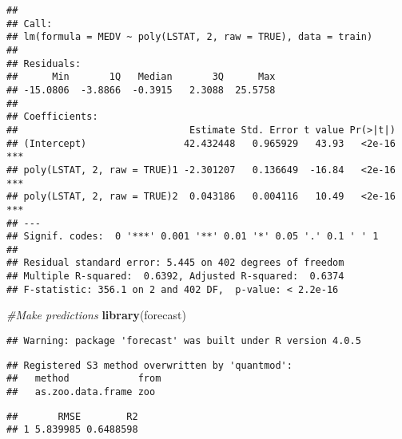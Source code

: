 \documentclass[
]{article}
\newenvironment{Shaded}{\begin{snugshade}}{\end{snugshade}}
\newcommand{\AttributeTok}[1]{\textcolor[rgb]{0.13,0.29,0.53}{#1}}
\newcommand{\CommentTok}[1]{\textcolor[rgb]{0.56,0.35,0.01}{\textit{#1}}}
\newcommand{\FunctionTok}[1]{\textcolor[rgb]{0.13,0.29,0.53}{\textbf{#1}}}
\newcommand{\NormalTok}[1]{#1}
\newcommand{\OtherTok}[1]{\textcolor[rgb]{0.56,0.35,0.01}{#1}}
\newcommand{\SpecialCharTok}[1]{\textcolor[rgb]{0.81,0.36,0.00}{\textbf{#1}}}
\begin{document}
\begin{verbatim}
## 
## Call:
## lm(formula = MEDV ~ poly(LSTAT, 2, raw = TRUE), data = train)
## 
## Residuals:
##      Min       1Q   Median       3Q      Max 
## -15.0806  -3.8866  -0.3915   2.3088  25.5758 
## 
## Coefficients:
##                              Estimate Std. Error t value Pr(>|t|)    
## (Intercept)                 42.432448   0.965929   43.93   <2e-16 ***
## poly(LSTAT, 2, raw = TRUE)1 -2.301207   0.136649  -16.84   <2e-16 ***
## poly(LSTAT, 2, raw = TRUE)2  0.043186   0.004116   10.49   <2e-16 ***
## ---
## Signif. codes:  0 '***' 0.001 '**' 0.01 '*' 0.05 '.' 0.1 ' ' 1
## 
## Residual standard error: 5.445 on 402 degrees of freedom
## Multiple R-squared:  0.6392, Adjusted R-squared:  0.6374 
## F-statistic: 356.1 on 2 and 402 DF,  p-value: < 2.2e-16
\end{verbatim}

\begin{Shaded}
\begin{Highlighting}[]
\CommentTok{\#Make predictions}
\FunctionTok{library}\NormalTok{(forecast)}
\end{Highlighting}
\end{Shaded}

\begin{verbatim}
## Warning: package 'forecast' was built under R version 4.0.5
\end{verbatim}

\begin{verbatim}
## Registered S3 method overwritten by 'quantmod':
##   method            from
##   as.zoo.data.frame zoo
\end{verbatim}

\begin{Shaded}
\end{Shaded}

\begin{verbatim}
##       RMSE        R2
## 1 5.839985 0.6488598
\end{verbatim}
\end{document}
